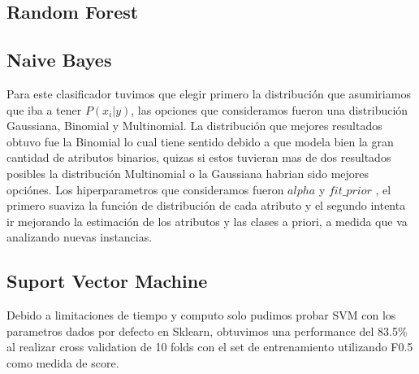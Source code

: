 \begin{enumerate}
\subsection{Random Forest}


\subsection{Naive Bayes}

Para este clasificador tuvimos que elegir primero la distribución que asumiriamos que iba a tener $ P(x_i | y) $, las opciones que consideramos fueron una distribución Gaussiana, Binomial y Multinomial. La distribución que mejores resultados obtuvo fue la Binomial lo cual tiene sentido debido a que modela bien la gran cantidad de atributos binarios, quizas si estos tuvieran mas de dos resultados posibles la distribución Multinomial o la Gaussiana habrian sido mejores opciónes.
Los hiperparametros que consideramos fueron $alpha$ y $fit\_prior$ , el primero suaviza la función de distribución de cada atributo y el segundo intenta ir mejorando la estimación de los atributos y las clases a priori, a medida que va analizando nuevas instancias.


\subsection{Suport Vector Machine}

Debido a limitaciones de tiempo y computo solo pudimos probar SVM con los parametros dados por defecto en Sklearn, obtuvimos una performance del 83.5\% al realizar cross validation de 10 folds con el set de entrenamiento utilizando F0.5 como medida de score.

\end{enumerate}
